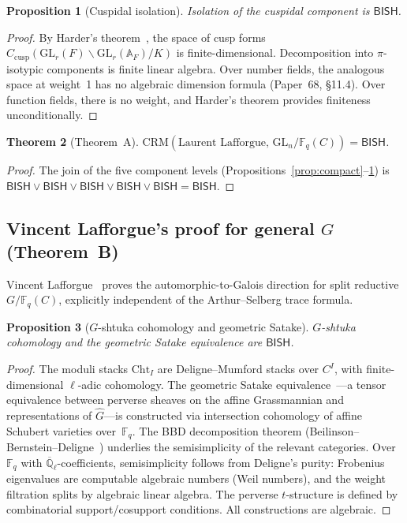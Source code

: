 \documentclass[11pt]{article}
\theoremstyle{plain}
\newtheorem{theorem}{Theorem}[section]
\newtheorem{proposition}[theorem]{Proposition}
\theoremstyle{definition}
\theoremstyle{remark}
\newcommand{\Q}{\mathbb{Q}}
\newcommand{\Fq}{\mathbb{F}_q}
\newcommand{\Qlbar}{\overline{\Q}_\ell}
\newcommand{\A}{\mathbb{A}}
\newcommand{\GL}{\mathrm{GL}}
\newcommand{\CRM}{\mathrm{CRM}}
\newcommand{\Cht}{\mathrm{Cht}}
\newcommand{\dualG}{\widehat{G}}
\newcommand{\BISH}{\mathsf{BISH}}
\begin{document}
\begin{proposition}[Cuspidal isolation]\label{prop:isolation}
Isolation of the cuspidal component is $\BISH$.
\end{proposition}

\begin{proof}
By Harder's theorem~\cite{Harder74}, the space of cusp forms
$C_{\mathrm{cusp}}(\GL_r(F) \backslash \GL_r(\A_F) / K)$ is
finite-dimensional. Decomposition into $\pi$-isotypic components is finite
linear algebra. Over number fields, the analogous space at weight~1 has no
algebraic dimension formula (Paper~68, \S11.4). Over function fields, there is
no weight, and Harder's theorem provides finiteness unconditionally.
\end{proof}

\begin{theorem}[Theorem~A]\label{thm:Laurent-main}
$\CRM(\text{Laurent Lafforgue, } \GL_n/\Fq(C)) = \BISH$.
\end{theorem}

\begin{proof}
The join of the five component levels
(Propositions~\ref{prop:compact}--\ref{prop:isolation}) is
$\BISH \vee \BISH \vee \BISH \vee \BISH \vee \BISH = \BISH$.
\end{proof}

\subsection{Vincent Lafforgue's proof for general $G$ (Theorem~B)}

Vincent Lafforgue~\cite{VLaf18,VLafICM} proves the automorphic-to-Galois
direction for split reductive $G/\Fq(C)$, explicitly independent of the
Arthur--Selberg trace formula.

\begin{proposition}[$G$-shtuka cohomology and geometric Satake]\label{prop:Satake}
$G$-shtuka cohomology and the geometric Satake equivalence are $\BISH$.
\end{proposition}

\begin{proof}
The moduli stacks $\Cht_I$ are Deligne--Mumford stacks over $C^I$, with
finite-dimensional $\ell$-adic cohomology. The geometric Satake
equivalence~\cite{MV07}---a tensor equivalence between perverse sheaves on
the affine Grassmannian and representations of $\dualG$---is constructed via
intersection cohomology of affine Schubert varieties over~$\Fq$.
The BBD decomposition theorem (Beilinson--Bernstein--Deligne~\cite{BBD82})
underlies the semisimplicity of the relevant categories. Over~$\Fq$ with
$\Qlbar$-coefficients, semisimplicity follows from Deligne's purity:
Frobenius eigenvalues are computable algebraic numbers (Weil numbers), and
the weight filtration splits by algebraic linear algebra. The perverse
$t$-structure is defined by combinatorial support/cosupport conditions.
All constructions are algebraic.
\end{proof}
\end{document}
